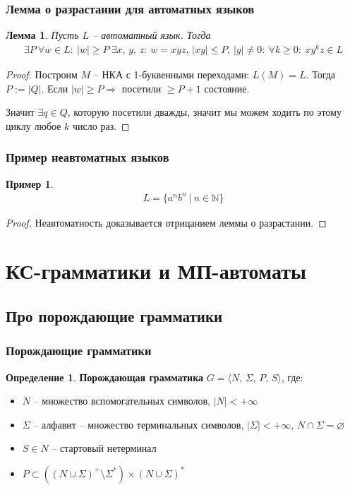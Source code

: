 \documentclass[a4paper,12pt]{article}
\renewcommand{\leq}{\ensuremath{\leqslant}}
\renewcommand{\geq}{\ensuremath{\geqslant}}
\renewcommand{\emptyset}{\ensuremath{\varnothing}}
\theoremstyle{plain}
\newtheorem{lemma}{Лемма}[subsection]
\theoremstyle{definition}
\newtheorem{definition}{Определение}[subsection]
\newtheorem*{example}{Пример}
\theoremstyle{remark}
\begin{document}
\subsubsection*{Лемма о разрастании для автоматных языков}
\begin{lemma}
	Пусть $L$ -- автоматный язык. Тогда
	\begin{align*}
		\exists P \: \forall w \in L :\: |w| \geq P \: \exists x,\,y,\,z:\: w = xyz,\, \vert xy \vert \leq P,\, |y| \neq 0 :\: \forall k \geq 0 :\: xy^kz \in L
	\end{align*}
\end{lemma}

\begin{proof}
	Построим $M$ -- НКА с 1-буквенными переходами: $L(M) = L$. Тогда $P := \vert Q \vert$. Если $\vert w \vert \geq P \Rightarrow$ посетили $\geq P + 1$ состояние.

	Значит $\exists q \in Q$, которую посетили дважды, значит мы можем ходить по этому циклу любое $k$ число раз.
\end{proof}

\subsubsection*{Пример неавтоматных языков}
\begin{example}
	\begin{align*}
		L = \{a^nb^n \:|\: n \in \mathbb{N}\}
	\end{align*}
\end{example}

\begin{proof}
	Неавтоматность доказывается отрицанием леммы о разрастании.
\end{proof}

\section{КС-грамматики и МП-автоматы}
\subsection{Про порождающие грамматики}
\subsubsection*{Порождающие грамматики}
\begin{definition}
	\textbf{Порождающая грамматика} $G = \langle N,\, \Sigma,\, P,\, S\rangle$, где:
	\begin{itemize}
		\item $N$ -- множество вспомогательных символов, $\vert N \vert < +\infty$
		\item $\Sigma$ -- алфавит -- множество терминальных символов, $\vert \Sigma \vert < +\infty,\, N \cap \Sigma = \emptyset$
		\item $S \in N$ -- стартовый нетерминал
		\item $P \subset ((N \cup \Sigma)^+ \setminus \Sigma^*) \times (N \cup \Sigma)^*$
	\end{itemize}
\end{definition}
\end{document}
